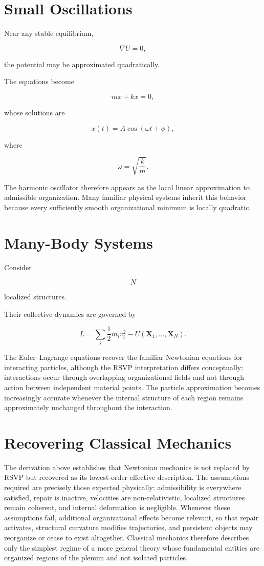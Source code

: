 \documentclass[11pt,oneside]{book}
\numberwithin{equation}{chapter}
\theoremstyle{definition}
\theoremstyle{plain}
\begin{document}
\section{Small Oscillations}

Near any stable equilibrium,

\[
\nabla U=0,
\]

the potential may be approximated quadratically.

The equations become

\[
m
\ddot x
+
kx
=
0,
\]

whose solutions are

\[
x(t)
=
A\cos(\omega t+\phi),
\]

where

\[
\omega
=
\sqrt{\frac{k}{m}}.
\]

The harmonic oscillator therefore appears as the local linear approximation to admissible organization. Many familiar physical systems inherit this behavior because every sufficiently smooth organizational minimum is locally quadratic.

\section{Many-Body Systems}

Consider

\[
N
\]

localized structures.

Their collective dynamics are governed by

\[
L
=
\sum_i
\frac12
m_i
v_i^2
-
U(\mathbf X_1,\ldots,\mathbf X_N).
\]

The Euler--Lagrange equations recover the familiar Newtonian equations for interacting particles, although the RSVP interpretation differs conceptually: interactions occur through overlapping organizational fields and not through action between independent material points. The particle approximation becomes increasingly accurate whenever the internal structure of each region remains approximately unchanged throughout the interaction.

\section{Recovering Classical Mechanics}

The derivation above establishes that Newtonian mechanics is not replaced by RSVP but recovered as its lowest-order effective description. The assumptions required are precisely those expected physically: admissibility is everywhere satisfied, repair is inactive, velocities are non-relativistic, localized structures remain coherent, and internal deformation is negligible. Whenever these assumptions fail, additional organizational effects become relevant, so that repair activates, structural curvature modifies trajectories, and persistent objects may reorganize or cease to exist altogether. Classical mechanics therefore describes only the simplest regime of a more general theory whose fundamental entities are organized regions of the plenum and not isolated particles.
\end{document}
